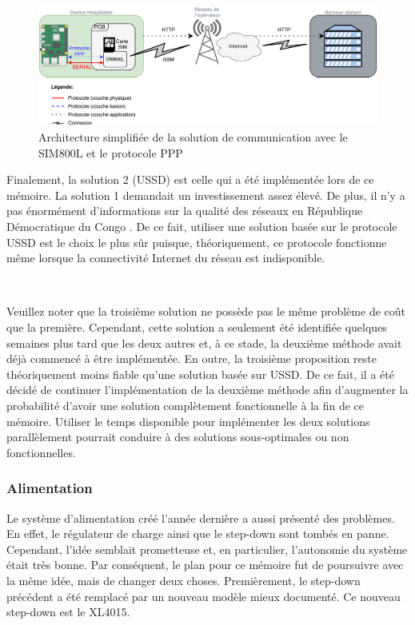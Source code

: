 \begin{figure}[ht!]
  \includegraphics[width=\textwidth]{img/el_prototype/solution3_com.png}
  \caption{Architecture simplifiée de la solution de communication avec le SIM800L et le protocole PPP}
  \label{fig:so2}
\end{figure}

\noindent
Finalement, la solution 2 (USSD) est celle qui a été implémentée lors de ce mémoire. La solution 1 demandait un investissement assez élevé. De plus, il n'y a pas énormément d'informations sur la qualité des réseaux en République Démocratique du Congo \cite{congo_tower}. De ce fait, utiliser une solution basée sur le protocole USSD est le choix le plus sûr puisque, théoriquement, ce protocole fonctionne même lorsque la connectivité Internet du réseau est indisponible.

~

\noindent
Veuillez noter que la troisième solution ne possède pas le même problème de coût que la première. Cependant, cette solution a seulement été identifiée quelques semaines plus tard que les deux autres et, à ce stade, la deuxième méthode avait déjà commencé à être implémentée. En outre, la troisième proposition reste théoriquement moins fiable qu'une solution basée sur USSD. De ce fait, il a été décidé de continuer l'implémentation de la deuxième méthode afin d'augmenter la probabilité d'avoir une solution complètement fonctionnelle à la fin de ce mémoire. Utiliser le temps disponible pour implémenter les deux solutions parallèlement pourrait conduire à des solutions sous-optimales ou non fonctionnelles.

\subsubsection{Alimentation}

Le système d'alimentation créé l'année dernière a aussi présenté des problèmes. En effet, le régulateur de charge ainsi que le step-down sont tombés en panne. Cependant, l'idée semblait prometteuse et, en particulier, l'autonomie du système était très bonne. Par conséquent, le plan pour ce mémoire fut de poursuivre avec la même idée, mais de changer deux choses. Premièrement, le step-down précédent a été remplacé par un nouveau modèle mieux documenté. Ce nouveau step-down est le XL4015.


